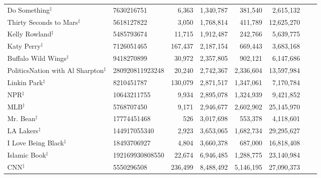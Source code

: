 \begin{longtable}{llrrrrrr}
                           Do Something$^\ddagger$ &       7630216751 &   6,363 &   1,340,787 &    381,540 &   2,615,132 &             &           \\
                 Thirty Seconds to Mars$^\ddagger$ &       5618127822 &   3,050 &   1,768,814 &    411,789 &  12,625,270 &             &           \\
                          Kelly Rowland$^\ddagger$ &       5485793674 &  11,715 &   1,912,487 &    242,766 &   5,639,775 &             &           \\
                             Katy Perry$^\ddagger$ &       7126051465 & 167,437 &   2,187,154 &    669,443 &   3,683,168 &             &           \\
                     Buffalo Wild Wings$^\ddagger$ &       9418270899 &  30,972 &   2,357,805 &    902,121 &   6,147,686 &             &           \\
        PoliticsNation with Al Sharpton$^\ddagger$ &  280920811923248 &  20,240 &   2,742,367 &  2,336,604 &  13,597,984 &             &           \\
                            Linkin Park$^\ddagger$ &       8210451787 & 130,079 &   2,871,517 &  1,347,061 &   7,170,784 &             &           \\
                                    NPR$^\ddagger$ &      10643211755 &   9,934 &   2,895,078 &  1,324,939 &   9,421,852 &             &           \\
                                    MLB$^\ddagger$ &       5768707450 &   9,171 &   2,946,677 &  2,602,902 &  25,145,970 &             &           \\
                               Mr. Bean$^\ddagger$ &      17774451468 &     526 &   3,017,698 &    553,378 &   4,118,601 &             &           \\
                              LA Lakers$^\ddagger$ &     144917055340 &   2,923 &   3,653,065 &  1,682,734 &  29,295,627 &             &           \\
                     I Love Being Black$^\ddagger$ &      18493706927 &   4,804 &   3,660,378 &    687,000 &  16,818,408 &             &           \\
                           Islamic Book$^\ddagger$ &  192169930808550 &  22,674 &   6,946,485 &  1,288,775 &  23,140,984 &             &           \\
                                    CNN$^\ddagger$ &       5550296508 & 236,499 &   8,488,492 &  5,146,195 &  27,090,373 &             &           \\

\end{longtable}
